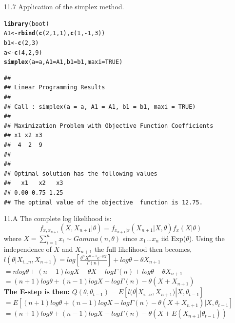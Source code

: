 \documentclass{article}\usepackage[]{graphicx}\usepackage[]{color}
\makeatletter
\newcommand{\hlkwd}[1]{\textcolor[rgb]{0.737,0.353,0.396}{\textbf{#1}}}%
\newenvironment{kframe}{%
 \def\at@end@of@kframe{}%
 \ifinner\ifhmode%
  \def\at@end@of@kframe{\end{minipage}}%
  \begin{minipage}{\columnwidth}%
 \fi\fi%
 \def\FrameCommand##1{\hskip\@totalleftmargin \hskip-\fboxsep
 \colorbox{shadecolor}{##1}\hskip-\fboxsep
     \hskip-\linewidth \hskip-\@totalleftmargin \hskip\columnwidth}%
 \MakeFramed {\advance\hsize-\width
   \@totalleftmargin\z@ \linewidth\hsize
   \@setminipage}}%
 {\par\unskip\endMakeFramed%
 \at@end@of@kframe}
\newenvironment{knitrout}{}{} %
\makeatother
\begin{document}
\begin{itemize}
\item[11.7]  Application of the simplex method.\\
\begin{knitrout}
\color{fgcolor}\begin{kframe}
\begin{alltt}
\hlkwd{library}(boot)
A1 <- \hlkwd{rbind}(\hlkwd{c}(2, 1, 1), \hlkwd{c}(1, -1, 3))
b1 <- \hlkwd{c}(2, 3)
a <- \hlkwd{c}(4, 2, 9)
\hlkwd{simplex}(a = a, A1 = A1, b1 = b1, maxi = TRUE)
\end{alltt}
\begin{verbatim}
## 
## Linear Programming Results
## 
## Call : simplex(a = a, A1 = A1, b1 = b1, maxi = TRUE)
## 
## Maximization Problem with Objective Function Coefficients
## x1 x2 x3 
##  4  2  9 
## 
## 
## Optimal solution has the following values
##   x1   x2   x3 
## 0.00 0.75 1.25 
## The optimal value of the objective  function is 12.75.
\end{verbatim}
\end{kframe}
\end{knitrout}


\item[11.A] The complete log likelihood is:\\
$$f_{x,x_{n+1}}(X,X_{n+1}|\theta)=f_{x_{n+1}|x}(X_{n+1}|X,\theta) f_x(X|\theta)$$
where $X=\sum_{i=1}^n x_i \sim Gamma(n,\theta)$ since $x_1 ... x_n$ iid Exp($\theta$).  Using the independence of $X$ and $X_{n+1}$ the full likelihood then becomes,\\
$l(\theta|X_{i...n},X_{n+1})=log\left[\frac{\theta^n X^{n-1} e^{-\theta X}}{\Gamma(n)}\right]+log\theta - \theta X_{n+1}$\\

$=nlog\theta + (n-1)logX -\theta X - log \Gamma(n) + log\theta - \theta X_{n+1}$\\

$=(n+1)log\theta + (n-1)logX - log\Gamma(n) - \theta(X+X_{n+1})$\\

\textbf{The E-step is then:}
$Q(\theta,\theta_{t-1})=E[l(\theta|X_{i...n},X_{n+1})|X,\theta_{t-1}]$\\

$=E[(n+1)log\theta + (n-1)logX - log\Gamma(n) - \theta(X+X_{n+1})|X,\theta_{t-1}]$\\

$=(n+1)log\theta + (n-1)logX - log\Gamma(n) - \theta(X + E(X_{n+1}|\theta_{t-1}))$\\


\end{itemize}
\end{document}
